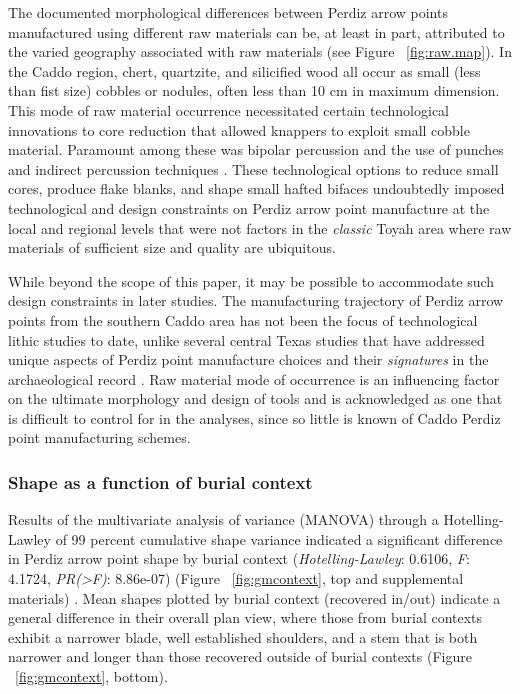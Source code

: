 \documentclass[review]{elsarticle}
\begin{document}
The documented morphological differences between Perdiz arrow points manufactured using different raw materials can be, at least in part, attributed to the varied geography associated with raw materials (see Figure ~\ref{fig:raw.map}). In the Caddo region, chert, quartzite, and silicified wood all occur as small (less than fist size) cobbles or nodules, often less than 10 cm in maximum dimension. This mode of raw material occurrence necessitated certain technological innovations to core reduction that allowed knappers to exploit small cobble material. Paramount among these was bipolar percussion and the use of punches and indirect percussion techniques \citep{RN8995,RN8996,RN8997,RN8998,RN2145}. These technological options to reduce small cores, produce flake blanks, and shape small hafted bifaces undoubtedly imposed technological and design constraints on Perdiz arrow point manufacture at the local and regional levels that were not factors in the \textit{classic} Toyah area where raw materials of sufficient size and quality are ubiquitous. 

While beyond the scope of this paper, it may be possible to accommodate such design constraints in later studies. The manufacturing trajectory of Perdiz arrow points from the southern Caddo area has not been the focus of technological lithic studies to date, unlike several central Texas studies that have addressed unique aspects of Perdiz point manufacture choices and their \textit{signatures} in the archaeological record \citep{RN8999,RN9000}. Raw material mode of occurrence is an influencing factor on the ultimate morphology and design of tools and is acknowledged as one that is difficult to control for in the analyses, since so little is known of Caddo Perdiz point manufacturing schemes.

\subsubsection*{Shape as a function of burial context}

Results of the multivariate analysis of variance (MANOVA) through a Hotelling-Lawley of 99 percent cumulative shape variance indicated a significant difference in Perdiz arrow point shape by burial context (\textit{Hotelling-Lawley}: 0.6106, \textit{F}: 4.1724, \textit{PR(>F)}: 8.86e-07) (Figure ~\ref{fig:gmcontext}, top and supplemental materials) \citep[Chapter 4]{RN8980}. Mean shapes plotted by burial context (recovered in/out) indicate a general difference in their overall plan view, where those from burial contexts exhibit a narrower blade, well established shoulders, and a stem that is both narrower and longer than those recovered outside of burial contexts (Figure ~\ref{fig:gmcontext}, bottom).
\end{document}
